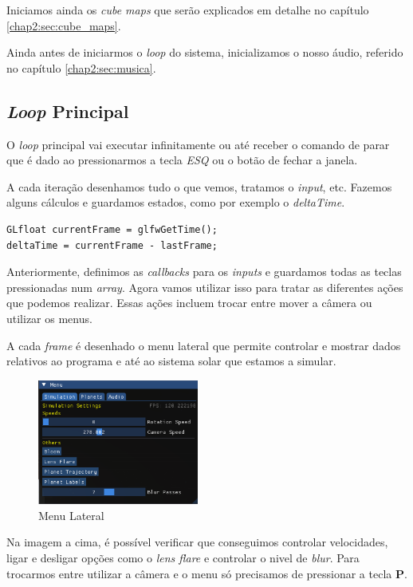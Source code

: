 \noindent
Iniciamos ainda os \textit{cube maps} que serão explicados em detalhe no capítulo \ref{chap2:sec:cube_maps}.

\noindent
Ainda antes de iniciarmos o \textit{loop} do sistema, inicializamos o nosso áudio, referido no capítulo \ref{chap2:sec:musica}.

\newpage
\subsection{\textit{Loop} Principal}

\noindent
O \textit{loop} principal vai executar infinitamente ou até receber o comando de parar que é dado ao pressionarmos a tecla \textit{ESQ} ou o botão de fechar a janela.

\noindent
A cada iteração desenhamos tudo o que vemos, tratamos o \textit{input}, etc. Fazemos alguns cálculos e guardamos estados, como por exemplo o \textit{deltaTime}.

\begin{lstlisting}[style=Cpp, caption=\textit{DeltaTime}]
GLfloat currentFrame = glfwGetTime();
deltaTime = currentFrame - lastFrame;
\end{lstlisting}

\noindent
Anteriormente, definimos as \textit{callbacks} para os \textit{inputs} e guardamos todas as teclas pressionadas num \textit{array}. Agora vamos utilizar isso para tratar as diferentes ações que podemos realizar.
Essas ações incluem trocar entre mover a câmera ou utilizar os menus.

\noindent
A cada \textit{frame} é desenhado o menu lateral que permite controlar e mostrar dados relativos ao programa e até ao sistema solar que estamos a simular.

\begin{figure}[h]
\centering
\includegraphics[width=150pt]{menu.png}
\caption{Menu Lateral}
\end{figure}

\noindent
Na imagem a cima, é possível verificar que conseguimos controlar velocidades, ligar e desligar opções como o \textit{lens flare} e controlar o nivel de \textit{blur}.
Para trocarmos entre utilizar a câmera e o menu só precisamos de pressionar a tecla \textbf{P}.

